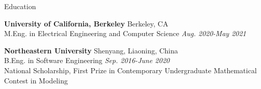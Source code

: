 \documentclass{resume}
\begin{document}
\begin{rSection}{Education}

{\bf University of California, Berkeley} \hfill Berkeley, CA
\\ M.Eng. in Electrical Engineering and Computer Science \hfill {\em Aug. 2020-May 2021}

{\bf Northeastern University} \hfill Shenyang, Liaoning, China 
\\ B.Eng. in Software Engineering \hfill {\em Sep. 2016-June 2020}
\\ National Scholarship, First Prize in Contemporary Undergraduate Mathematical Contest in Modeling

\end{rSection}
\end{document}
